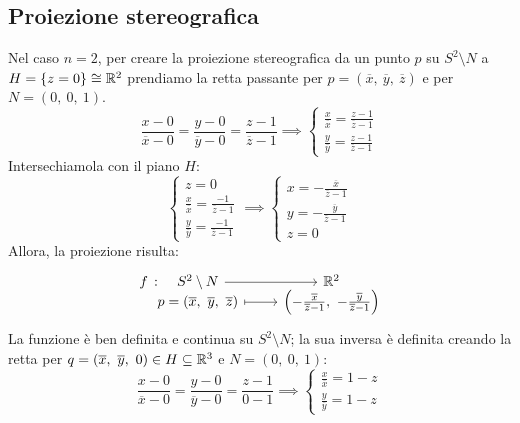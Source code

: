 \subsection{Proiezione stereografica}\label{proiezionestereograficanote}
Nel caso $n=2$, per creare la proiezione stereografica da un punto $p$ su $S^2\setminus N$ a $H=\{z=0\}\cong\mathbb{R}^2$ prendiamo la retta passante per $p=\left(\overline{x},\ \overline{y},\ \overline{z}\right)$ e per $N=\left(0,\ 0,\ 1\right)$.
\begin{equation*}
\frac{x-0}{\overline{x}-0}=\frac{y-0}{\overline{y}-0}=\frac{z-1}{\overline{z}-1}\implies
\begin{cases}
\frac{x}{\overline{x}}=\frac{z-1}{\overline{z}-1}\\
\frac{y}{\overline{y}}=\frac{z-1}{\overline{z}-1}
\end{cases}
\end{equation*}
Intersechiamola con il piano $H$:
\begin{equation*}
\begin{cases}
	z=0\\
	\frac{x}{\overline{x}}=\frac{-1}{\overline{z}-1}\\
	\frac{y}{\overline{y}}=\frac{-1}{\overline{z}-1}
\end{cases}\implies
\begin{cases}
	x=-\frac{\overline{x}}{\overline{z}-1}\\
	y=-\frac{\overline{y}}{\overline{z}-1}\\
	z=0
\end{cases}
\end{equation*}
Allora, la proiezione risulta:
\begin{equation}
	\funztot{f}{S^2\setminus N}{\realset^2}{p=\left(\overline{x},\ \overline{y},\ \overline{z}\right)}{\left(-\frac{\overline{x}}{\overline{z}-1},\ -\frac{\overline{y}}{\overline{z}-1}\right)}
\end{equation}
La funzione è ben definita e continua su $S^2\setminus N$; la sua inversa è definita creando la retta per $q=\left(\overline{x},\ \overline{y},\ 0\right)\in H\subseteq \mathbb{R}^3$ e $N=\left(0,\ 0,\ 1\right)$:
\begin{equation*}
	\frac{x-0}{\overline{x}-0}=\frac{y-0}{\overline{y}-0}=\frac{z-1}{0-1}\implies
	\begin{cases}
		\frac{x}{\overline{x}}=1-z\\
		\frac{y}{\overline{y}}=1-z
	\end{cases}
\end{equation*}
